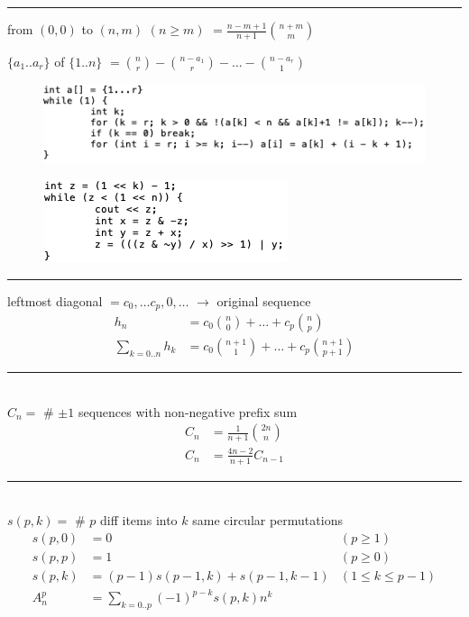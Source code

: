 \documentclass[10pt,landscape]{article}
\begin{document}
\noindent\rule{\linewidth}{1pt}

 from $(0,0)$ to $(n,m)$ $(n \ge m)$ $= \frac{n-m+1}{n+1} \binom{n+m}{m}$

 $\{a_1 .. a_r\}$ of $\{1 .. n\}$ $= \binom{n}{r} - \binom{n-a_1}{r} - \hdots - \binom{n-a_r}{1}$

\begin{figure}[h] \includegraphics[scale=0.5]{a.png} \end{figure}

\begin{figure}[h] \includegraphics[scale=0.5]{b.png} \end{figure}

\noindent\rule{\linewidth}{1pt}

 leftmost diagonal $= c_0, \hdots c_p, 0, \hdots $ $\rightarrow$ original sequence
\begin{align*}
	h_n &= c_0 \binom{n}{0} + \hdots + c_p \binom{n}{p} \\
	\sum_{k = 0..n}{h_k} &= c_0 \binom{n+1}{1} + \hdots + c_p \binom{n+1}{p+1}
\end{align*}

\noindent\rule{\linewidth}{1pt}

 \\ $C_n =$ \# $\pm 1$ sequences with non-negative prefix sum
\begin{align*}
	C_n &= \frac{1}{n+1} \binom{2n}{n} \\
	C_n &= \frac{4n-2}{n+1} C_{n-1}
\end{align*}

\noindent\rule{\linewidth}{1pt}

 \\ $s(p,k) =$ \# $p$ diff items into $k$ same circular permutations
\begin{align*}
	s(p,0) &= 0 & (p \ge 1) \\
	s(p,p) &= 1 & (p \ge 0) \\
	s(p,k) &= (p-1) s(p-1,k) + s(p-1,k-1) & (1 \le k \le p-1) \\
	A_n^p &= \sum_{k = 0..p}{(-1)^{p-k} s(p,k) n^k}
\end{align*}
\end{document}
